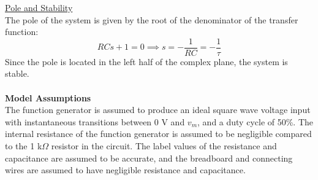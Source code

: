 \documentclass[12pt]{article}
\begin{document}
\underline{Pole and Stability}\\
The pole of the system is given by the root of the denominator of the transfer function:
\[RCs + 1 = 0 \implies s = -\frac{1}{RC} = -\frac{1}{\tau}\]
Since the pole is located in the left half of the complex plane, the system is stable.\\\\
\textbf{Model Assumptions}\\
The function generator is assumed to produce an ideal square wave voltage input with instantaneous transitions between 0 V and $v_m$, and a duty cycle of 50\%. The internal resistance of the function generator is assumed to be negligible compared to the 1 k$\Omega$ resistor in the circuit. The label values of the resistance and capacitance are assumed to be accurate, and the breadboard and connecting wires are assumed to have negligible resistance and capacitance.
\end{document}
